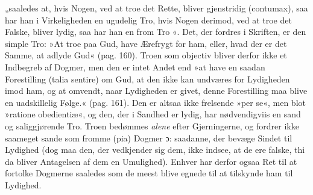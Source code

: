 \documentclass[12pt,a4paper]{book}
\newcommand{\opage}[1]{\marginnote{\footnotesize\textit{[#1]}}}
\begin{document}
„saaledes at, hvis Nogen, ved at troe det Rette, bliver gjenstridig (contumax), saa har han i Virkeligheden en ugudelig Tro,
\opage{157} \setcounter{footnote}{0}%
hvis Nogen derimod, ved at troe det Falske, bliver lydig, saa har han en from Tro
«. Det, der fordres i Skriften, er den simple Tro: »At troe paa Gud, have Ærefrygt for ham, eller, hvad der er det Samme, at adlyde Gud« (pag. 160). Troen som objectiv bliver derfor ikke et Indbegreb af Dogmer, men den er intet Andet end »at have en saadan Forestilling (talia sentire) om Gud, at den ikke kan undværes for Lydigheden imod ham, og at omvendt, naar Lydigheden er givet, denne Forestilling maa blive en uadskillelig Følge.« (pag. 161). Den er altsaa ikke frelsende »per se«, men blot »ratione obedientiæ«, og den, der i Sandhed er lydig, har nødvendigviis en sand og saliggjørende Tro. Troen bedømmes \emph{alene} efter Gjerningerne, og fordrer ikke saameget sande som fromme (pia) Dogmer ɔ: saadanne, der bevæge Sindet til Lydighed (dog maa den, der vedkjender sig dem, ikke indsee, at de ere falske, thi da bliver Antagelsen af dem en Umulighed). Enhver har derfor ogsaa Ret til at fortolke Dogmerne saaledes som de meest blive egnede til at tilskynde ham til Lydighed.
\end{document}
